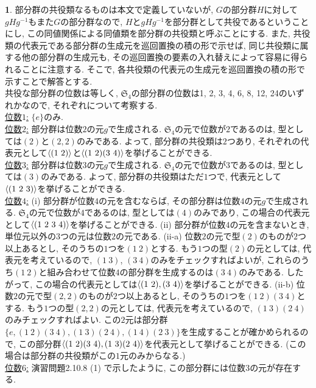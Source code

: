 \documentclass{amsart}
\theoremstyle{definition}
\newtheorem{ans}{}
\numberwithin{ans}{subsection}
\DeclarePairedDelimiter{\gen}{\langle}{\rangle}
\begin{document}
\begin{ans}
  部分群の共役類なるものは本文で定義していないが, $G$の部分群$H$に対して$gHg^{-1}$もまた$G$の部分群なので,
  $H$と$gHg^{-1}$を部分群として共役であるということにし, この同値関係による同値類を部分群の共役類と呼ぶことにする.
  また, 共役類の代表元である部分群の生成元を巡回置換の積の形で示せば, 同じ共役類に属する他の部分群の生成元も, その巡回置換の要素の入れ替えによって容易に得られることに注意する.
  そこで, 各共役類の代表元の生成元を巡回置換の積の形で示すことで解答とする.\\
  共役な部分群の位数は等しく, $\mathfrak{S}_4$の部分群の位数は1, 2, 3, 4, 6, 8, 12, 24のいずれかなので, それぞれについて考察する.\\
  \underline{位数$1$:}
  $\{e\}$のみ. \\
  \underline{位数$2$:}
  部分群は位数$2$の元$g$で生成される.
  $\mathfrak{S}_4$の元で位数が$2$であるのは, 型としては$(2)$と$(2, 2)$のみである.
  よって, 部分群の共役類は$2$つあり, それぞれの代表元として$\gen{(1\ 2)}$と$\gen{(1\ 2)(3\ 4)}$を挙げることができる.\\
  \underline{位数$3$:} 部分群は位数$3$の元$g$で生成される.
  $\mathfrak{S}_4$の元で位数が$3$であるのは, 型としては$(3)$のみである.
  よって, 部分群の共役類はただ$1$つで, 代表元として$\gen{(1\ 2\ 3)}$を挙げることができる.\\
  \underline{位数$4$:}
  (i) 部分群が位数$4$の元を含むならば, その部分群は位数$4$の元$g$で生成される.
  $\mathfrak{S}_4$の元で位数が$4$であるのは, 型としては$(4)$のみであり,
  この場合の代表元として$\gen{(1\ 2\ 3\ 4)}$を挙げることができる.
  (ii) 部分群が位数$4$の元を含まないとき, 単位元以外の$3$つの元は位数$2$の元である.
  (ii-a) 位数$2$の元で型$(2)$のものが$2$つ以上あるとし, そのうちの$1$つを$(1\ 2)$とする.
  もう$1$つの型$(2)$の元としては, 代表元を考えているので, $(1\ 3)$, $(3\ 4)$のみをチェックすればよいが,
  これらのうち$(1\ 2)$と組み合わせて位数$4$の部分群を生成するのは$(3\ 4)$のみである.
  したがって, この場合の代表元としては$\gen{(1\ 2), (3\ 4)}$を挙げることができる.
  (ii-b) 位数$2$の元で型$(2, 2)$のものが$2$つ以上あるとし, そのうちの$1$つを$(1\ 2)(3\ 4)$とする.
  もう$1$つの型$(2, 2)$の元としては, 代表元を考えているので, $(1\ 3)(2\ 4)$のみチェックすればよい.
  この$2$元は部分群$\{e, (1\ 2)(3\ 4), (1\ 3)(2\ 4), (1\ 4)(2\ 3)\}$を生成することが確かめられるので,
  この部分群$\gen{(1\ 2)(3\ 4), (1\ 3)(2\ 4)}$を代表元として挙げることができる.
  (この場合は部分群の共役類がこの$1$元のみからなる.)\\
  \underline{位数$6$:}
  演習問題2.10.8 (1) で示したように, この部分群には位数$3$の元が存在する.

\end{ans}
\end{document}

